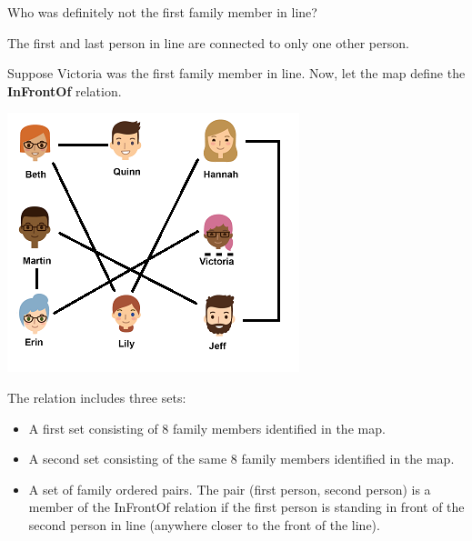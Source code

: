 \documentclass{ximera}
\begin{document}
\begin{exercise}
Who was definitely not the first family member in line?

  \begin{selectAll}
  \end{selectAll}
  \begin{feedback}
The first and last person in line are connected to only one other person.
  \end{feedback}
\end{exercise}





  \begin{definition}
  Suppose Victoria was the first family member in line. Now, let the map define the \textbf{InFrontOf} relation.
  
  \includegraphics[width=321px,height=285px]{pics/standinline.png}
  
  The  relation includes three sets:
    \begin{itemize}
    \item A first set consisting of 8 family members identified in the map.
    \item A second set consisting of the same 8 family members identified in the map.
    \item A set of family ordered pairs. The pair (first person, second person) is a member of the InFrontOf relation if the first person is standing in front of the second person in line (anywhere closer to the front of the line).
    \end{itemize}
  \end{definition}
\end{document}
